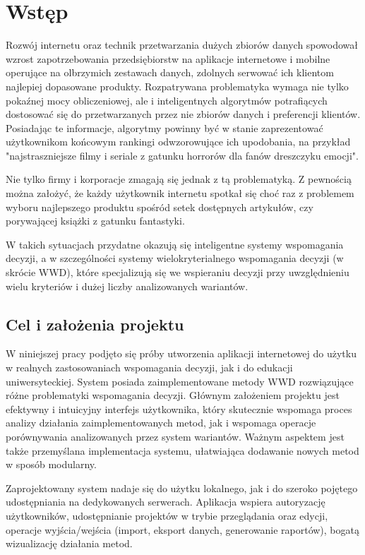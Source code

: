 
\chapter{Wstęp}

Rozwój internetu oraz technik przetwarzania dużych zbiorów danych spowodował wzrost zapotrzebowania przedsiębiorstw na aplikacje internetowe i mobilne operujące na olbrzymich zestawach danych, zdolnych serwować ich klientom najlepiej dopasowane produkty.  Rozpatrywana problematyka wymaga nie tylko pokaźnej mocy obliczeniowej, ale i inteligentnych algorytmów potrafiących dostosować się do przetwarzanych przez nie zbiorów danych i preferencji klientów. Posiadając te informacje, algorytmy powinny być w stanie zaprezentować użytkownikom końcowym rankingi odwzorowujące ich upodobania, na przykład "najstraszniejsze filmy i seriale z gatunku horrorów dla fanów dreszczyku emocji".

Nie tylko firmy i korporacje zmagają się jednak z tą problematyką. Z pewnością można założyć, że każdy użytkownik internetu spotkał się choć raz z problemem wyboru najlepszego produktu spośród setek dostępnych artykułów, czy porywającej książki z gatunku fantastyki.

W takich sytuacjach przydatne okazują się inteligentne systemy wspomagania decyzji, a w szczególności systemy wielokryterialnego wspomagania decyzji (w skrócie WWD), które specjalizują się we wspieraniu decyzji przy uwzględnieniu wielu kryteriów i dużej liczby analizowanych wariantów.

\section{Cel i założenia projektu}

W niniejszej pracy podjęto się próby utworzenia aplikacji internetowej do użytku w realnych zastosowaniach wspomagania decyzji, jak i do edukacji uniwersyteckiej. System posiada zaimplementowane metody WWD rozwiązujące różne problematyki wspomagania decyzji.  Głównym założeniem projektu jest efektywny i intuicyjny interfejs użytkownika, który skutecznie wspomaga proces analizy działania zaimplementowanych metod, jak i wspomaga operacje porównywania analizowanych przez system wariantów. Ważnym aspektem jest także przemyślana implementacja systemu, ułatwiająca dodawanie nowych metod w sposób modularny.

Zaprojektowany system nadaje się do użytku lokalnego, jak i do szeroko pojętego udostępniania na dedykowanych serwerach. Aplikacja wspiera autoryzację użytkowników, udostępnianie projektów w trybie przeglądania oraz edycji, operacje wyjścia/wejścia (import, eksport danych, generowanie raportów),  bogatą wizualizację działania metod.
\newpage
